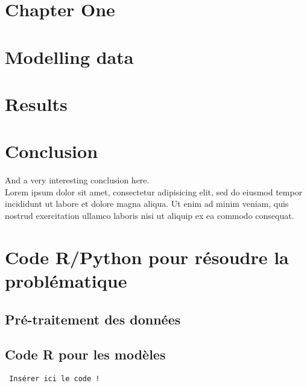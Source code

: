 \documentclass[a4paper, oneside, english, 12pt, final]{extreport}
\begin{document}


\chapter{Chapter One}%
\label{chap:chapterone}



\chapter{Modelling data}
\label{chap:2}


\chapter{Results}
\label{chap:3}
%
%



\chapter*{Conclusion}
\label{chap:conclusion}
%
  And a very interesting conclusion here\@. ~\\
  Lorem ipsum dolor sit amet, consectetur adipisicing elit, sed do eiusmod
  tempor incididunt ut labore et dolore magna aliqua. Ut enim ad minim veniam,
  quis nostrud exercitation ullamco laboris nisi ut aliquip ex ea commodo
  consequat.

\newpage
\appendix
{}

\chapter{Code R/Python pour résoudre la problématique}
\label{chap:appendix}


\section{Pré-traitement des données}
\section{Code R pour les modèles}
 
 \begin{verbatim}
 Insérer ici le code !
 \end{verbatim}
\end{document}
